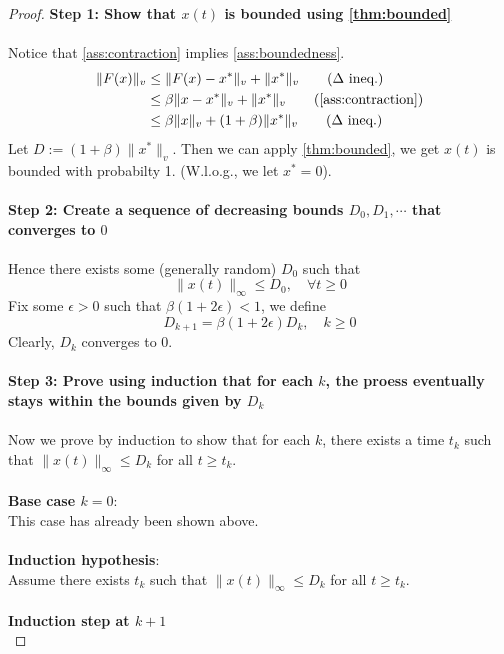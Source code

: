 \begin{proof}
\textbf{Step 1: Show that $x(t)$ is bounded using \autoref{thm:bounded}}\\
\\
   Notice that \autoref{ass:contraction} implies \autoref{ass:boundedness}.
        \begin{align*}
        \|F(x)\|_v &\le \|F(x)-x^*\|_v + \|x^*\|_v\tag{$\Delta$ ineq.}\\
        &\le \beta \|x-x^*\|_v+\|x^*\|_v\tag{\autoref{ass:contraction}}\\
        &\le \beta\|x\|_v + (1+\beta) \|x^*\|_v\tag{$\Delta$ ineq.}
    \end{align*}
    Let $D:= (1+\beta)\|x^*\|_v$. Then we can apply \autoref{thm:bounded}, we get $x(t)$ is bounded with probabilty 1. (W.l.o.g., we let $x^*=0$).\\
    \\
    \textbf{Step 2: Create a sequence of decreasing bounds $D_0, D_1,\cdots$ that converges to $0$}\\
    \\
    Hence there exists some (generally random) $D_0$ such that 
    $$
    \|x(t)\|_\infty \le D_0,\quad \forall t\ge 0
    $$
    Fix some $\epsilon>0$ such that $\beta(1+2\epsilon)<1$, we define
    \begin{equation}\label{eq:Dkrecursive}
        D_{k+1} = \beta(1+2\epsilon)D_k,\quad k\ge 0
    \end{equation}
    Clearly, $D_k$ converges to $0$.\\
    \\
    \textbf{Step 3: Prove using induction that for each $k$, the proess eventually stays within the bounds given by $D_k$}\\
    \\
    Now we prove by induction to show that for each $k$, there exists a time $t_k$ such that $\|x(t)\|_\infty\le D_k$ for all $t\ge t_k$.\\
    \\
    \textbf{Base case $k=0$}:\\
    This case has already been shown above.\\
    \\
    \textbf{Induction hypothesis}:\\
    Assume there exists $t_k$ such that $\|x(t)\|_\infty \le D_k$ for all $t\ge t_k$.\\
    \\
    \textbf{Induction step at $k+1$}\\

\end{proof}

